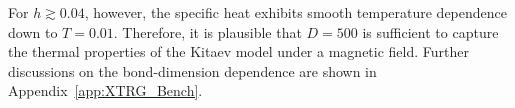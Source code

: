\documentclass[twocolumn,superscriptaddress,showpacs, longbibliography, aps, prb]{revtex4-2}
\newcommand{\red}[1]{\textcolor{red}{#1}}
\begin{document}
For $h \gtrsim 0.04$, however, 
the specific heat %
exhibits smooth temperature dependence down to $T=0.01$. 
Therefore, it is plausible that $D=500$ is sufficient to %
capture the thermal properties of the
Kitaev model under a magnetic field. 
Further discussions on the bond-dimension dependence are shown in Appendix~\ref{app:XTRG_Bench}.

\begin{figure}
  \begin{center}

\end{center}
\end{figure}
\end{document}
